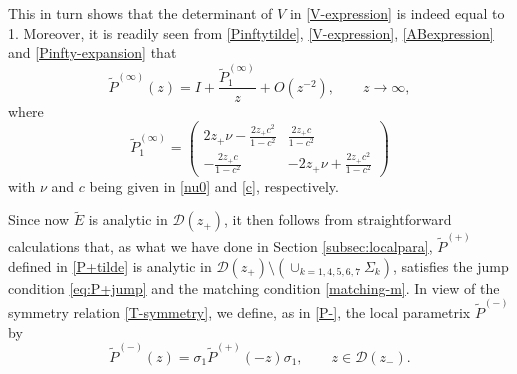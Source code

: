 \documentclass[11pt,a4paper]{article}
\numberwithin{equation}{section}
\begin{document}
This in turn shows that the determinant of $V$ in \eqref{V-expression} is indeed equal to 1. Moreover, it is readily seen from \eqref{Pinftytilde}, \eqref{V-expression}, \eqref{ABexpression} and \eqref{Pinfty-expansion} that
\begin{equation}\label{Pinftyatinfty}
\widetilde{P}^{(\infty)}(z)=I+\frac{\widetilde{P}_1^{(\infty)}}{z}
+O(z^{-2}), \qquad z\to \infty,
\end{equation}
where
\begin{equation}\label{eq:tildeP1infty}
\widetilde{P}_1^{(\infty)}=\begin{pmatrix}
2z_+\nu-\frac{2z_+c^2}{1-c^2} & \frac{2z_+c}{1-c^2}\\
-\frac{2z_+c}{1-c^2} & -2z_+\nu+\frac{2z_+c^2}{1-c^2}
\end{pmatrix}
\end{equation}
with $\nu$ and $c$ being given in \eqref{nu0} and \eqref{c}, respectively.


Since now $\widetilde{E}$ is analytic in $\mathcal{D}(z_+)$, it then follows from straightforward calculations that, as what we have done in Section \ref{subsec:localpara}, $\widetilde{P}^{(+)}$ defined in \eqref{P+tilde} is analytic in $\mathcal{D}(z_{+}) \setminus (\cup_{k=1,4, 5, 6,7} \Sigma_{k})$, satisfies the jump condition \eqref{eq:P+jump} and the matching condition \eqref{matching-m}. In view of the symmetry relation \eqref{T-symmetry}, we define, as in \eqref{P-},
the local parametrix $\widetilde{P}^{(-)}$ by
\begin{equation}\label{P-tilde}
\widetilde{P}^{(-)}(z)=\sigma_1\widetilde{P}^{(+)}(-z)\sigma_1,\qquad z\in\mathcal{D}(z_{-}).
\end{equation}

%

\end{document}
